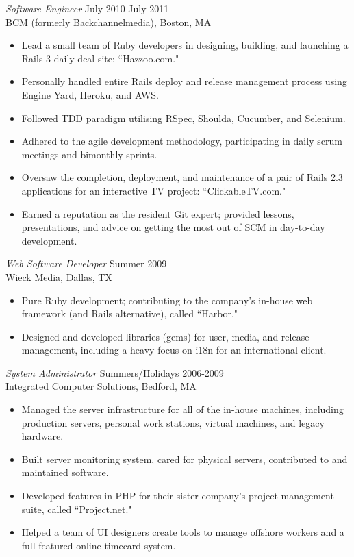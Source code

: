 \documentclass[line,margin]{res}
\begin{document}
\begin{resume}
  {\sl Software Engineer}  \hfill July 2010-July 2011 \\
  BCM (formerly Backchannelmedia),
  Boston, MA
  \begin{itemize}  \itemsep -2pt %
    \item Lead a small team of Ruby developers in designing, building, and launching a Rails 3 daily deal site: ``Hazzoo.com."
    \item Personally handled entire Rails deploy and release management process using Engine Yard, Heroku, and AWS.
    \item Followed TDD paradigm utilising RSpec, Shoulda, Cucumber, and Selenium.
    \item Adhered to the agile development methodology, participating in daily scrum meetings and bimonthly sprints.
    \item Oversaw the completion, deployment, and maintenance of a pair of Rails 2.3 applications for an interactive TV project: ``ClickableTV.com."
    \item Earned a reputation as the resident Git expert; provided lessons, presentations, and advice on getting the most out of SCM in day-to-day development.
  \end{itemize}

  {\sl Web Software Developer}  \hfill Summer 2009 \\
  Wieck Media,
  Dallas, TX
  \begin{itemize}  \itemsep -2pt %
    \item Pure Ruby development; contributing to the company's in-house web framework (and Rails alternative), called ``Harbor."
    \item Designed and developed libraries (gems) for user, media, and release management, including a heavy focus on i18n for an international client.
  \end{itemize}
  
\clearpage %

  {\sl System Administrator}  \hfill Summers/Holidays 2006-2009 \\
  Integrated Computer Solutions,
  Bedford, MA
  \begin{itemize}  \itemsep -2pt %
       \item Managed the server infrastructure for all of the in-house machines, including production servers, personal work stations, virtual machines, and legacy hardware.
       \item Built server monitoring system, cared for physical servers, contributed to and maintained software.
       \item Developed features in PHP for their sister company's project management suite, called ``Project.net."
       \item Helped a team of UI designers create tools to manage offshore workers and a full-featured online timecard system.
  \end{itemize}


\end{resume}
\end{document}
